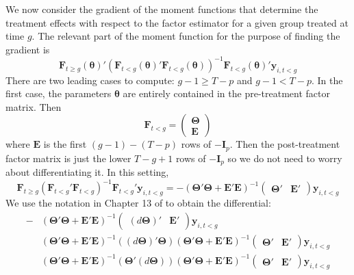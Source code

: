 We now consider the gradient of the moment functions that determine the treatment effects with respect to the factor estimator for a given group treated at time $g$. The relevant part of the moment function for the purpose of finding the gradient is 
\begin{equation}
    \bm F_{t \geq g}(\bm \theta)' \left( \bm F_{t < g}(\bm \theta)' \bm F_{t < g}(\bm \theta) \right)^{-1} \bm F_{t < g}(\bm \theta)' \bm y_{i,t < g}
\end{equation}
There are two leading cases to compute: $g - 1 \geq T - p$ and $g - 1 < T - p$. In the first case, the parameters $\bm \theta$ are entirely contained in the pre-treatment factor matrix. Then 
\begin{equation}
    \bm F_{t < g} = 
    \begin{pmatrix}
        \bm \Theta\\
        \bm E
    \end{pmatrix}
\end{equation}
where $\bm E$ is the first $(g - 1) - (T - p)$ rows of $- \bm I_p$. Then the post-treatment factor matrix is just the lower $T - g + 1$ rows of $- \bm I_p$ so we do not need to worry about differentiating it. In this setting,
\begin{equation}
    \bm F_{t \geq g} \left( \bm F_{t < g}' \bm F_{t < g} \right)^{-1} \bm F_{t < g}' \bm y_{i,t < g} = - \left( \bm \Theta' \bm \Theta + \bm E' \bm E \right)^{-1} 
    \begin{pmatrix}
        \bm \Theta' & \bm E'
    \end{pmatrix}
    \bm y_{i,t < g}
\end{equation}
We use the notation in Chapter 13 of \citet{abadir2005matrix} to obtain the differential: 
\begin{align}
   - &
   \left( \bm \Theta' \bm \Theta + \bm E' \bm E \right)^{-1} 
    \begin{pmatrix}
        (d \bm \Theta)' & \bm E'
    \end{pmatrix}
    \bm y_{i,t < g}\\ 
    &
    \left( \bm \Theta' \bm \Theta + \bm E' \bm E \right)^{-1} \left( (d \bm \Theta)' \bm \Theta  \right) \left( \bm \Theta' \bm \Theta + \bm E' \bm E \right)^{-1}
    \begin{pmatrix}
        \bm \Theta' & \bm E'
    \end{pmatrix}
    \bm y_{i,t < g} \\
    &
    \left( \bm \Theta' \bm \Theta + \bm E' \bm E \right)^{-1} \left( \bm \Theta' (d \bm \Theta)  \right) \left( \bm \Theta' \bm \Theta + \bm E' \bm E \right)^{-1}
    \begin{pmatrix}
        \bm \Theta' & \bm E'
    \end{pmatrix}
    \bm y_{i,t < g} 
\end{align}
